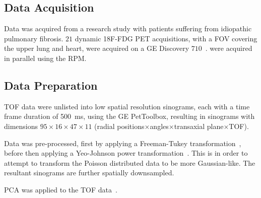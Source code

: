     \subsection{Data Acquisition} \label{sec:data_acquisition}
        Data was acquired from a research study with patients suffering from idiopathic pulmonary fibrosis. $21$ dynamic \acrshort{18F-FDG} \acrshort{PET} acquisitions, with a \acrlong{FOV} covering the upper lung and heart, were acquired on a \acrshort{GE} Discovery $710$~\cite{Oh2019OptimalTreatment, Emond2020EffectReconstruction}.  were acquired in parallel using the \gls{RPM}.
    
        
    \subsection{Data Preparation} \label{sec:data_preparation}
        \gls{TOF} data were unlisted into low spatial resolution sinograms, each with a time frame duration of \SI{500}{\milli\second}, using the \acrshort{GE} PetToolbox, resulting in sinograms with dimensions $95\times16\times47\times11$ (radial positions$\times$angles$\times$transaxial plane$\times$\gls{TOF}).
        
        Data was pre-processed, first by applying a Freeman-Tukey transformation~\cite{Freeman1950TransformationsRoot}, before then applying a Yeo-Johnson power transformation~\cite{Yeo2000ASymmetry}. This is in order to attempt to transform the Poisson distributed data to be more Gaussian-like. The resultant sinograms are further spatially downsampled.
        
        \acrshort{PCA} was applied to the \gls{TOF} data~\cite{Bertolli2017DataData}.
    
        
